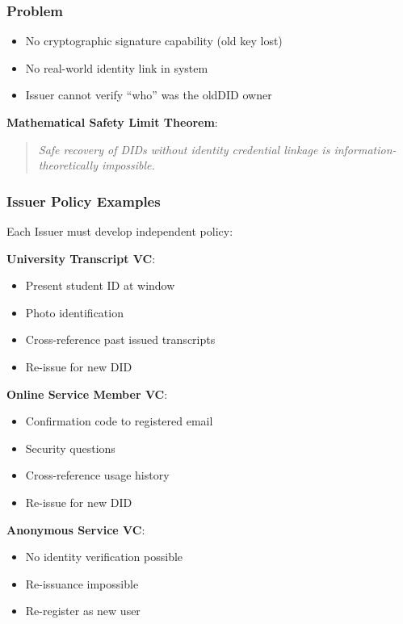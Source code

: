 \subsubsection{Problem}

\begin{itemize}
  \item No cryptographic signature capability (old key lost)
  \item No real-world identity link in system
  \item Issuer cannot verify ``who'' was the oldDID owner
\end{itemize}

\textbf{Mathematical Safety Limit Theorem}:

\begin{quote}
\textit{Safe recovery of DIDs without identity credential linkage is information-theoretically impossible.}
\end{quote}

\subsubsection{Issuer Policy Examples}

Each Issuer must develop independent policy:

\textbf{University Transcript VC}:
\begin{itemize}
  \item Present student ID at window
  \item Photo identification
  \item Cross-reference past issued transcripts
  \item Re-issue for new DID
\end{itemize}

\textbf{Online Service Member VC}:
\begin{itemize}
  \item Confirmation code to registered email
  \item Security questions
  \item Cross-reference usage history
  \item Re-issue for new DID
\end{itemize}

\textbf{Anonymous Service VC}:
\begin{itemize}
  \item No identity verification possible
  \item Re-issuance impossible
  \item Re-register as new user
\end{itemize}

